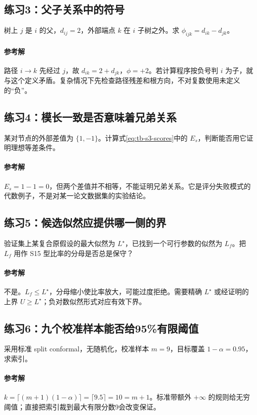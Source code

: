 \subsection{练习3：父子关系中的符号}
树上 $j$ 是 $i$ 的父，$d_{ij}=2$，外部端点 $k$ 在 $i$ 子树之外。求 $\phi_{ijk}=d_{ik}-d_{jk}$。
\paragraph{参考解}路径 $i\to k$ 先经过 $j$，故 $d_{ik}=2+d_{jk}$，$\phi=+2$。若计算程序按负号判 $i$ 为子，就与这个定义矛盾。复杂情况下先检查路径残差和根方向，不对复数使用未定义的“负”。

\subsection{练习4：模长一致是否意味着兄弟关系}
某对节点的外部差值为 $\{1,-1\}$。计算式\eqref{eq:tb-s3-scores}中的 $E_s$，判断能否用它证明理想等差条件。
\paragraph{参考解} $E_s=1-1=0$，但两个差值并不相等，不能证明兄弟关系。它是评分失败模式的代数例子，不是对某一论文数据集的实验结论。

\subsection{练习5：候选似然应提供哪一侧的界}
验证集上某复合原假设的最大似然为 $L^\star$，已找到一个可行参数的似然为 $L_f$。把 $L_f$ 用作 S15 型比率的分母是否总是保守？
\paragraph{参考解}不是。$L_f\leq L^\star$，分母缩小使比率放大，可能过度拒绝。需要精确 $L^\star$ 或经证明的上界 $U\geq L^\star$；负对数似然形式对应有效下界。

\subsection{练习6：九个校准样本能否给95\%有限阈值}
采用标准 split conformal，无随机化，校准样本 $m=9$，目标覆盖 $1-\alpha=0.95$，求索引。
\paragraph{参考解} $k=\lceil(m+1)(1-\alpha)\rceil=\lceil9.5\rceil=10=m+1$。标准带额外 $+\infty$ 的规则给无穷阈值；直接把索引裁到最大有限分数9会改变保证。

